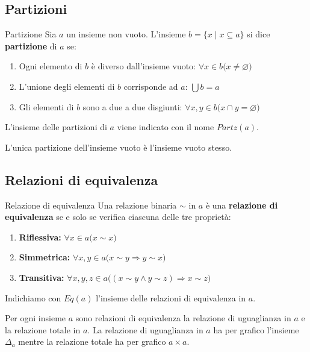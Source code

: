 \subsection{Partizioni}
\begin{defbox}{Partizione}
	Sia $a$ un insieme non vuoto. L'insieme	$b=\{x \; |\; x \subseteq a \}$ si dice \textbf{partizione} di $a$ se:
	\begin{enumerate}
		\item Ogni elemento di $b$ è diverso dall'insieme vuoto: $\forall x \in b \bigl(x \neq \varnothing \bigr)$
		\item L'unione degli elementi di $b$ corrisponde ad $a$: $\bigcup b = a$
		\item Gli elementi di $b$ sono a due a due disgiunti: $\forall x,y \in b \bigl(x \cap y = \varnothing \bigr)$
	\end{enumerate}
	L'insieme delle partizioni di $a$ viene indicato con il nome $Partz(a)$.
\end{defbox}

\begin{osservation}
	L'unica partizione dell'insieme vuoto è l'insieme vuoto stesso.
\end{osservation}

\subsection{Relazioni di equivalenza}

\begin{defbox}{Relazione di equivalenza}
	Una relazione binaria $\sim$ in $a$ è una \textbf{relazione di equivalenza} se e solo se verifica ciascuna delle tre proprietà:
	\begin{enumerate}
		\item \textbf{Riflessiva:} $\forall x \in a \bigl( x \sim x \bigr)$
		\item \textbf{Simmetrica:} $\forall x,y \in a \bigl( x \sim y \Rightarrow y \sim x \bigr)$
		\item \textbf{Transitiva:} $\forall x,y,z \in a \bigl( (x \sim y \wedge y \sim z) \Rightarrow x \sim z \bigr)$
	\end{enumerate}
	Indichiamo con $Eq(a)$ l'insieme delle relazioni di equivalenza in $a$.
\end{defbox}

\begin{osservation}
	Per ogni insieme $a$ sono relazioni di equivalenza la relazione di uguaglianza in $a$ e la relazione totale in $a$. La relazione di uguaglianza in $a$ ha per grafico l'insieme $\Delta_{a}$ mentre la relazione totale ha per grafico $a \times a$.
\end{osservation}


